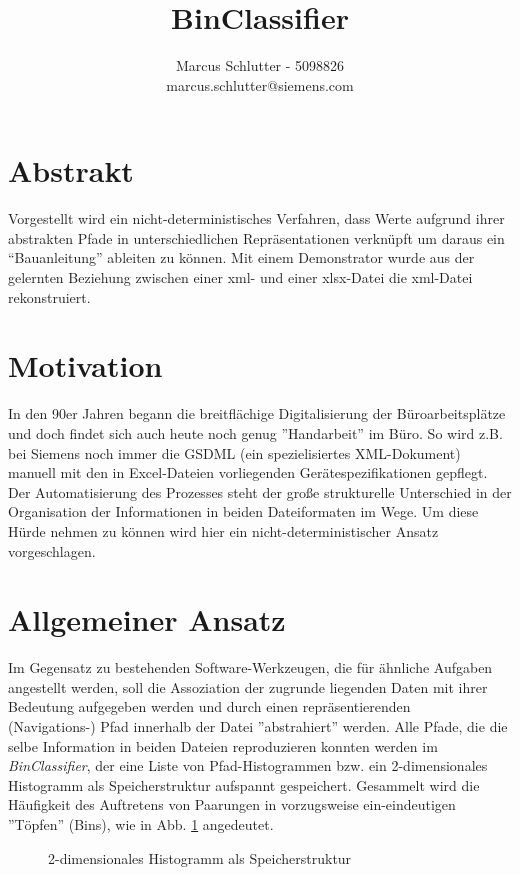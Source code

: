 \documentclass[a4paper,10pt]{article}
\title{BinClassifier}
\author{Marcus Schlutter - 5098826\\marcus.schlutter@siemens.com}
\begin{document}
\maketitle

\section{Abstrakt}
Vorgestellt wird ein nicht-deterministisches Verfahren, dass Werte aufgrund ihrer abstrakten Pfade in
unterschiedlichen Repräsentationen verknüpft um daraus ein ``Bauanleitung'' ableiten zu können. Mit
einem Demonstrator wurde aus der gelernten Beziehung zwischen einer xml- und einer xlsx-Datei die
xml-Datei rekonstruiert.

\section{Motivation}
\label{sec:motivation}
In den 90er Jahren begann die breitflächige Digitalisierung der Büroarbeitsplätze und doch findet sich auch
heute noch genug ''Handarbeit'' im Büro. So wird z.B. bei Siemens noch immer die GSDML (ein spezielisiertes
XML-Dokument) manuell mit den in Excel-Dateien vorliegenden Gerätespezifikationen gepflegt. Der
Automatisierung des Prozesses steht der große strukturelle Unterschied in der Organisation der Informationen
in beiden Dateiformaten im Wege. Um diese Hürde nehmen zu können wird hier ein nicht-deterministischer
Ansatz vorgeschlagen.

\section{Allgemeiner Ansatz}
Im Gegensatz zu bestehenden Software-Werkzeugen, die für ähnliche Aufgaben angestellt werden, soll die
Assoziation der zugrunde liegenden Daten mit ihrer Bedeutung aufgegeben werden und durch einen
repräsentierenden\\(Navigations-) Pfad innerhalb der Datei ''abstrahiert'' werden. Alle Pfade, die
die selbe Information in beiden Dateien reproduzieren konnten werden im \textit{BinClassifier}, der eine
Liste von Pfad-Histogrammen bzw. ein 2-dimensionales Histogramm als Speicherstruktur aufspannt gespeichert.
Gesammelt wird die Häufigkeit des Auftretens von Paarungen in vorzugsweise ein-eindeutigen ''Töpfen''
(Bins), wie in Abb. \ref{classifier_table} angedeutet.

\begin{figure}[h]
 \centering
 \caption{2-dimensionales Histogramm als Speicherstruktur}
 \label{classifier_table}
\end{figure}
\end{document}

